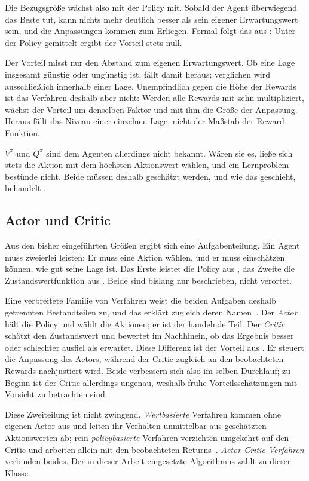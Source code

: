 Die Bezugsgröße wächst also mit der Policy mit. Sobald der Agent überwiegend das
Beste tut, kann nichts mehr deutlich besser als sein eigener Erwartungswert
sein, und die Anpassungen kommen zum Erliegen. Formal folgt das aus
: Unter der Policy gemittelt ergibt der Vorteil stets null.

Der Vorteil misst nur den Abstand zum eigenen Erwartungswert. Ob eine Lage
insgesamt günstig oder ungünstig ist, fällt damit heraus; verglichen wird
ausschließlich innerhalb einer Lage. Unempfindlich gegen die Höhe der Rewards
ist das Verfahren deshalb aber nicht: Werden alle Rewards mit zehn
multipliziert, wächst der Vorteil um denselben Faktor und mit ihm die Größe der
Anpassung. Heraus fällt das Niveau einer einzelnen Lage, nicht der Maßstab der
Reward-Funktion.

$V^{\pi}$ und $Q^{\pi}$ sind dem Agenten allerdings nicht bekannt. Wären sie es,
ließe sich stets die Aktion mit dem höchsten Aktionswert wählen, und ein
Lernproblem bestünde nicht. Beide müssen deshalb geschätzt werden, und wie das
geschieht, behandelt .

\subsection{Actor und Critic}
\label{sec:actorcritic}

Aus den bisher eingeführten Größen ergibt sich eine Aufgabenteilung. Ein Agent
muss zweierlei leisten: Er muss eine Aktion wählen, und er muss einschätzen
können, wie gut seine Lage ist. Das Erste leistet die Policy aus
, das Zweite die Zustandswertfunktion aus
. Beide sind bislang nur beschrieben, nicht verortet.

Eine verbreitete Familie von Verfahren weist die beiden Aufgaben deshalb
getrennten Bestandteilen zu, und das erklärt zugleich deren
Namen~\cite[Abschn.~13.5]{suttonbarto2018}. Der
\emph{Actor} hält die Policy und wählt die Aktionen; er ist der handelnde Teil.
Der \emph{Critic} schätzt den Zustandswert und bewertet im Nachhinein, ob das
Ergebnis besser oder schlechter ausfiel als erwartet. Diese Differenz ist der
Vorteil aus . Er steuert die Anpassung des Actors, während
der Critic zugleich an den beobachteten Rewards nachjustiert wird. Beide
verbessern sich also im selben Durchlauf; zu Beginn ist der Critic allerdings
ungenau, weshalb frühe Vorteilsschätzungen mit Vorsicht zu betrachten sind.

Diese Zweiteilung ist nicht zwingend. \emph{Wertbasierte} Verfahren kommen ohne
eigenen Actor aus und leiten ihr Verhalten unmittelbar aus geschätzten
Aktionswerten ab; rein \emph{policybasierte} Verfahren verzichten umgekehrt auf
den Critic und arbeiten allein mit den beobachteten
Returns~\cite[Abschn.~13.3--13.5]{suttonbarto2018}.
\emph{Actor-Critic-Verfahren} verbinden beides. Der in dieser Arbeit
eingesetzte Algorithmus zählt zu dieser Klasse.

